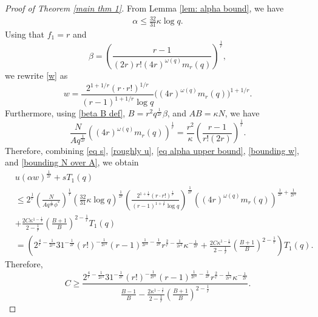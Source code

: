 \documentclass[10pt,a4paper]{amsart}
\begin{document}
\begin{proof}[Proof of Theorem \ref{main thm 1}]
From Lemma \ref{lem: alpha bound}, we have
\begin{align}\label{eq alpha upper bound}
\alpha \le \frac{32}{31}\kappa \log{q}.    
\end{align}
Using that $f_1 = r$ and \begin{equation}\label{beta B def}\beta = \left(\frac{r-1}{(2r)r!(4r)^{\omega(q)}m_r(q)}\right)^{\frac{1}{r}},
\end{equation}
we rewrite \eqref{w} as
\begin{equation}\label{bounding w}
    w = \frac{2^{1+1/r}(r\cdot r!)^{1/r}}{(r-1)^{1+1/r}\log q} \bigl(\left(4r\right)^{\omega(q)}m_r(q)\bigr)^{1+1/r}.
\end{equation}
Furthermore, using \eqref{beta B def}, $B = r^2q^{\frac{1}{2r}}\beta$, and $AB = \kappa N$, we have
\begin{equation}\label{bounding N over A}
\frac{N}{A q^{\frac{1}{2r}}}\left((4r)^{\omega(q)}m_r(q)\right)^{\frac{1}{r}} = \frac{r^2}{\kappa}\left(\frac{r-1}{r!(2r)}\right)^{\frac{1}{r}}.
\end{equation}
Therefore, combining \eqref{eq s}, \eqref{roughly u}, \eqref{eq alpha upper bound}, \eqref{bounding w}, and \eqref{bounding N over A},  we obtain
\begin{align*}
    &u(\alpha w)^{\frac{1}{2r}}+sT_1(q)\\ 
    &\le 2^{\frac{1}{r}}\left(\frac{N}{Aq^{\frac{1}{2r}}\phi^*}\right)^{\frac{1}{r}}\left(\frac{32}{31}\kappa \log{q}\right)^{\frac{1}{2r}}\left(\frac{2^{1+\frac{1}{r}}(r\cdot r!)^{\frac{1}{r}}}{(r-1)^{1+\frac{1}{r}}\log{q}}\right)^{\frac{1}{2r}}\left((4r)^{\omega(q)}m_r(q)\right)^{\frac{1}{2r}+\frac{1}{2r^2}}\\ &+\frac{2C\kappa^{1-\frac{1}{r}}}{2-\frac{1}{r}}\left(\frac{B+1}{B}\right)^{2-\frac{1}{r}}T_1(q)\\
    &= \left(2^{\frac{4}{r}-\frac{1}{2r^2}}31^{-\frac{1}{2r}}(r!)^{-\frac{1}{2r^2}}(r-1)^{\frac{1}{2r^2}-\frac{1}{2r}}r^{\frac{2}{r}-\frac{1}{2r^2}}\kappa^{-\frac{1}{2r}} +\frac{2C\kappa^{1-\frac{1}{r}}}{2-\frac{1}{r}}\left(\frac{B+1}{B}\right)^{2-\frac{1}{r}}\right)T_1(q).
\end{align*}
Therefore,
\begin{equation} \label{C lower bound}
C \ge \frac{2^{\frac{4}{r}-\frac{1}{2r^2}}31^{-\frac{1}{2r}}(r!)^{-\frac{1}{2r^2}}(r-1)^{\frac{1}{2r^2}-\frac{1}{2r}}r^{\frac{2}{r}-\frac{1}{2r^2}}\kappa^{-\frac{1}{2r}}}{\frac{B-1}{B}-\frac{2\kappa^{1-\frac{1}{r}}}{2-\frac{1}{r}}\left(\frac{B+1}{B}\right)^{2-\frac{1}{r}}}.
\end{equation}


\end{proof}
\end{document}
